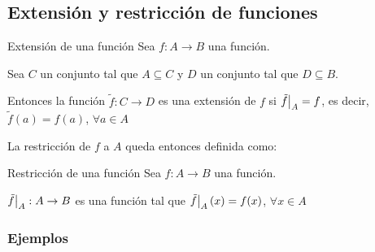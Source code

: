 \subsection{Extensión y restricción de funciones}

\begin{definicion}{Extensión de una función}{}
    Sea $f: A \to B$ una función. 

    Sea $C$ un conjunto tal que $A \subseteq C$ y $D$ un conjunto tal que 
    $D \subseteq B$.

    \medskip
    
    Entonces la función $\tilde{f}: C \to D$ es una extensión de $f$ si 
    $\frest{\tilde{f}}{A} = f$, es decir, 
    $\tilde{f}(a) = f(a)$, $\forall a \in A$

\end{definicion}

\bigskip
La restricción de $f$ a $A$ queda entonces definida como:

\begin{definicion}{Restricción de una función}{}
    Sea $f: A \to B$ una función. 

    \medskip

    \begin{center}
        $\frest{\tilde{f}}{A}: A \to B$ es una función tal que 
        $\frest{\tilde{f}}{A} (x) = f(x)$, $\forall x \in A$
    \end{center}
\end{definicion}

\subsubsection{Ejemplos}

